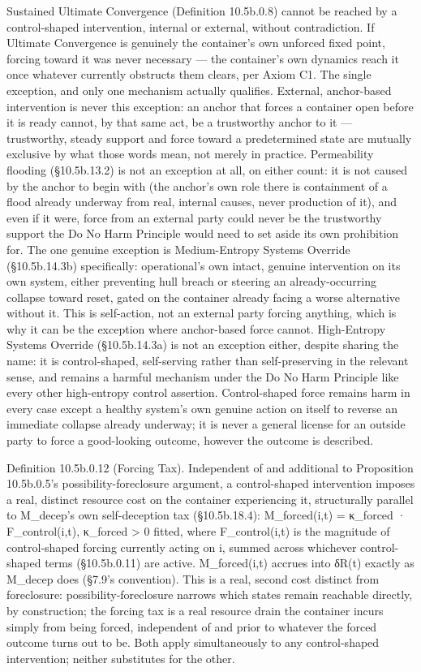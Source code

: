 \documentclass[
]{article}
\begin{document}
Sustained Ultimate Convergence (Definition 10.5b.0.8) cannot be reached
by a control-shaped intervention, internal or external, without
contradiction. If Ultimate Convergence is genuinely the container's own
unforced fixed point, forcing toward it was never necessary --- the
container's own dynamics reach it once whatever currently obstructs them
clears, per Axiom C1. The single exception, and only one mechanism
actually qualifies. External, anchor-based intervention is never this
exception: an anchor that forces a container open before it is ready
cannot, by that same act, be a trustworthy anchor to it --- trustworthy,
steady support and force toward a predetermined state are mutually
exclusive by what those words mean, not merely in practice. Permeability
flooding (§10.5b.13.2) is not an exception at all, on either count: it
is not caused by the anchor to begin with (the anchor's own role there
is containment of a flood already underway from real, internal causes,
never production of it), and even if it were, force from an external
party could never be the trustworthy support the Do No Harm Principle
would need to set aside its own prohibition for. The one genuine
exception is Medium-Entropy Systems Override (§10.5b.14.3b)
specifically: operational's own intact, genuine intervention on its own
system, either preventing hull breach or steering an already-occurring
collapse toward reset, gated on the container already facing a worse
alternative without it. This is self-action, not an external party
forcing anything, which is why it can be the exception where
anchor-based force cannot. High-Entropy Systems Override (§10.5b.14.3a)
is not an exception either, despite sharing the name: it is
control-shaped, self-serving rather than self-preserving in the relevant
sense, and remains a harmful mechanism under the Do No Harm Principle
like every other high-entropy control assertion. Control-shaped force
remains harm in every case except a healthy system's own genuine action
on itself to reverse an immediate collapse already underway; it is never
a general license for an outside party to force a good-looking outcome,
however the outcome is described.

Definition 10.5b.0.12 (Forcing Tax). Independent of and additional to
Proposition 10.5b.0.5's possibility-foreclosure argument, a
control-shaped intervention imposes a real, distinct resource cost on
the container experiencing it, structurally parallel to M\_decep's own
self-deception tax (§10.5b.18.4): M\_forced(i,t) = κ\_forced ·
F\_control(i,t), κ\_forced \textgreater{} 0 fitted, where
F\_control(i,t) is the magnitude of control-shaped forcing currently
acting on i, summed across whichever control-shaped terms (§10.5b.0.11)
are active. M\_forced(i,t) accrues into δR(t) exactly as M\_decep does
(§7.9's convention). This is a real, second cost distinct from
foreclosure: possibility-foreclosure narrows which states remain
reachable directly, by construction; the forcing tax is a real resource
drain the container incurs simply from being forced, independent of and
prior to whatever the forced outcome turns out to be. Both apply
simultaneously to any control-shaped intervention; neither substitutes
for the other.
\end{document}
